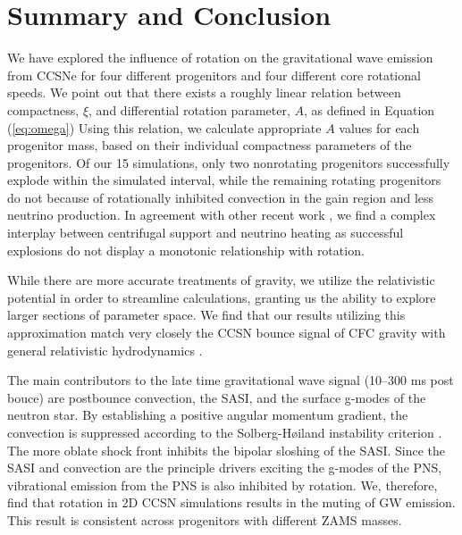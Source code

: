 \documentclass[twocolumn,times]{aastex62}  %
\begin{document}



\section{Summary and Conclusion}
\label{sec:summary}

We have explored the influence of rotation on the gravitational wave emission from CCSNe for four different progenitors and four different core rotational speeds.  
We point out that there exists a roughly linear relation between compactness, $\xi$, and differential rotation parameter, $A$, as defined in Equation (\ref{eq:omega}) 
Using this relation, we calculate appropriate $A$ values for each progenitor mass, based on their individual compactness parameters of the \citet{Suk:2016} progenitors.  Of our 15 simulations, only two nonrotating progenitors successfully explode within the simulated interval, while the remaining rotating progenitors do not because of rotationally inhibited convection in the gain region and less neutrino production.  In agreement with other recent work \citep[e.g.,][]{summa:2018}, we find a complex interplay between centrifugal support and neutrino heating as successful explosions do not display a monotonic relationship with rotation.

While there are more accurate treatments of gravity, we utilize the relativistic potential in order to streamline calculations, granting us the ability to explore larger sections of parameter space. 
We find that our results utilizing this approximation match very closely the CCSN bounce signal of CFC gravity with general relativistic hydrodynamics \citep{richers:2017}.  

The main contributors to the late time gravitational wave signal (10--300 ms post bouce) are postbounce convection, the SASI, and the surface g-modes of the neutron star.  By establishing a positive angular momentum gradient, the convection is suppressed according to the Solberg-H{\o}iland instability criterion \citep{endal:1978,fryer:2000}.  The more oblate shock front inhibits the bipolar sloshing of the SASI.  Since the SASI and convection are the principle drivers exciting the g-modes of the PNS, vibrational emission from the PNS is also inhibited by rotation.  
We, therefore, find that rotation in 2D CCSN simulations results in the muting of GW emission.
This result is consistent across progenitors with different ZAMS masses. 
\end{document}
